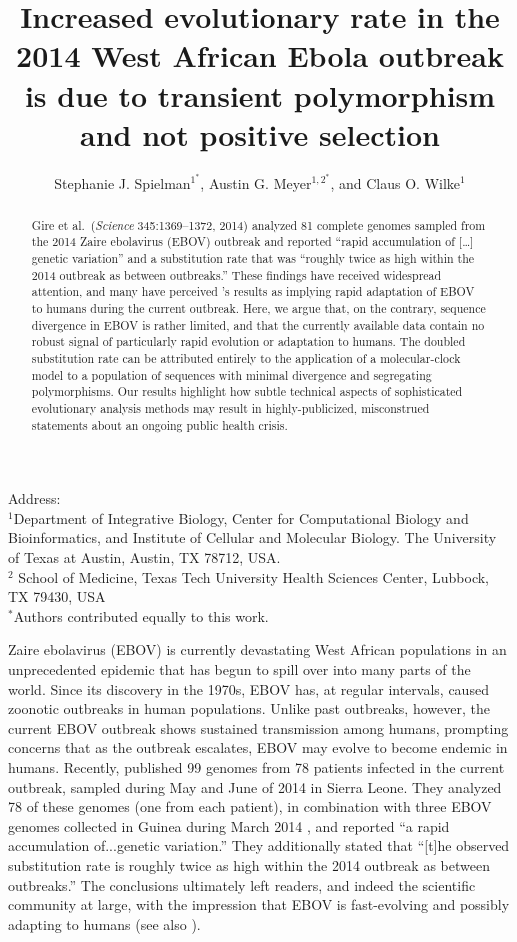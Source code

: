 \documentclass[11pt]{article}
\title{Increased evolutionary rate in the 2014 West African Ebola outbreak is due to transient polymorphism and not positive selection}
\author{Stephanie J. Spielman$^{1^\ast}$, Austin G. Meyer$^{1,2^\ast}$, and Claus O. Wilke$^{1}$}
\begin{document}
\maketitle
\maketitle
\noindent
Address:\\
$^1$Department of Integrative Biology, Center for Computational Biology and Bioinformatics, and Institute of Cellular and Molecular Biology.
The University of Texas at Austin, Austin, TX 78712, USA.\\
$^2$ School of Medicine, Texas Tech University Health Sciences Center, Lubbock, TX 79430, USA \\
$^\ast$Authors contributed equally to this work.


\begin{abstract}
Gire et al.\ (\emph{Science} 345:1369--1372, 2014) analyzed 81 complete genomes sampled from the 2014 Zaire ebolavirus (EBOV) outbreak and reported ``rapid accumulation of [\dots] genetic variation'' and a substitution rate that was ``roughly twice as high within the 2014 outbreak as between outbreaks.'' These findings have received widespread attention, and many have perceived \citet{Gire2014}'s results as implying rapid adaptation of EBOV to humans during the current outbreak. Here, we argue that, on the contrary, sequence divergence in EBOV is rather limited, and that the currently available data contain no robust signal of particularly rapid evolution or adaptation to humans. The doubled substitution rate can be attributed entirely to the application of a molecular-clock model to a population of sequences with minimal divergence and segregating polymorphisms. Our results highlight how subtle technical aspects of sophisticated evolutionary analysis methods may result in highly-publicized, misconstrued statements about an ongoing public health crisis.
\end{abstract}

\noindent
Zaire ebolavirus (EBOV) is currently devastating West African populations in an unprecedented epidemic that has begun to spill over into many parts of the world. Since its discovery in the 1970s, EBOV has, at regular intervals, caused zoonotic outbreaks in human populations. Unlike past outbreaks, however, the current EBOV outbreak shows sustained transmission among humans, prompting concerns that as the outbreak escalates, EBOV may evolve to become endemic in humans. Recently, \citet{Gire2014} published 99 genomes from 78 patients infected in the current outbreak, sampled during May and June of 2014 in Sierra Leone. They analyzed 78 of these genomes (one from each patient), in combination with three EBOV genomes collected in Guinea during March 2014 \citep{Baizeetal2014}, and reported ``a rapid accumulation of...genetic variation.'' They additionally stated that ``[t]he observed substitution rate is roughly twice as high within the 2014 outbreak as between outbreaks.'' The conclusions ultimately left readers, and indeed the scientific community at large, with the impression that EBOV is fast-evolving and possibly adapting to humans (see also \citealt{NatureEditorial,Alexanderetal2014}). 
\end{document}
